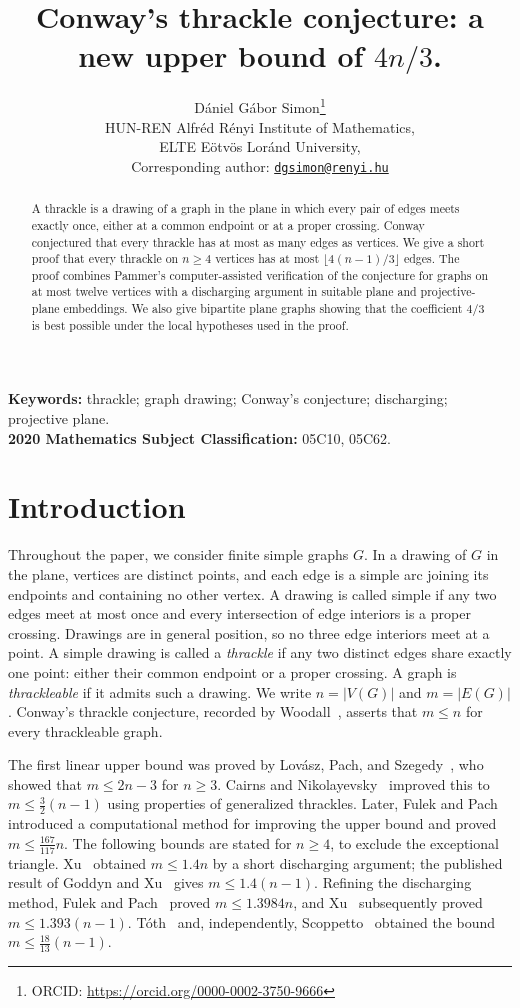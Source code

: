 \documentclass[11pt,a4paper]{article}
\title{Conway's thrackle conjecture: a new upper bound of $4n/3$.}
\author{D\'aniel G\'abor Simon\thanks{ORCID: \url{https://orcid.org/0000-0002-3750-9666}}\\[4pt]
\small HUN-REN Alfr\'ed R\'enyi Institute of Mathematics,\\
\small ELTE E\"otv\"os Lor\'and University,\\[2pt]
\small Corresponding author: \href{mailto:dgsimon@renyi.hu}{\texttt{dgsimon@renyi.hu}}}
\date{}
\begin{document}
\maketitle

\begin{abstract}
A thrackle is a drawing of a graph in the plane in which every pair of
edges meets exactly once, either at a common endpoint or at a proper
crossing. Conway conjectured that every thrackle has at most as many
edges as vertices. We give a short proof that every thrackle on
$n\ge4$ vertices has at most $\lfloor4(n-1)/3\rfloor$ edges.
The proof combines Pammer's computer-assisted verification of the conjecture for graphs on at most twelve vertices with a discharging argument in suitable plane and projective-plane embeddings. We also give bipartite plane graphs showing
that the coefficient $4/3$ is best possible under the local hypotheses
used in the proof.
\end{abstract}

\noindent\textbf{Keywords:} thrackle; graph drawing; Conway's conjecture;
discharging; projective plane.\\
\textbf{2020 Mathematics Subject Classification:} 05C10, 05C62.

\section{Introduction}

Throughout the paper, we consider finite simple graphs $G$. In a drawing
of $G$ in the plane, vertices are distinct points, and each edge is a
simple arc joining its endpoints and containing no other vertex. A drawing
is called simple if any two edges meet at most once and every intersection
of edge interiors is a proper crossing. Drawings are in general position,
so no three edge interiors meet at a point.
A simple drawing is called a \emph{thrackle} if any two distinct edges
share exactly one point: either their common endpoint or a proper
crossing. A graph is \emph{thrackleable} if it admits such a drawing.
We write $n=|V(G)|$ and $m=|E(G)|$. Conway's thrackle conjecture,
recorded by Woodall~\cite{Woodall1971}, asserts that $m\le n$ for
every thrackleable graph.

The first linear upper bound
was proved by Lov\'asz, Pach, and Szegedy~\cite{LPS1997}, who showed that
$m\le2n-3$ for $n\ge3$. Cairns and Nikolayevsky~\cite{CN2000} improved
this to $m\le\frac32(n-1)$ using properties of generalized thrackles.
Later, Fulek and Pach~\cite{FP2011} introduced a computational method
for improving the upper bound and proved $m\le\frac{167}{117}n$.
The following bounds are stated for $n\ge4$, to exclude the exceptional
triangle. Xu~\cite{Xu2014} obtained $m\le1.4n$ by a short discharging
argument; the published result of Goddyn and Xu~\cite{GX2017} gives
$m\le1.4(n-1)$. Refining the discharging method, Fulek and
Pach~\cite{FP2019} proved $m\le1.3984n$, and Xu~\cite{Xu2021}
subsequently proved $m\le1.393(n-1)$.
T\'oth~\cite{Toth2026} and, independently, Scoppetto~\cite{Scoppetto2026}
obtained the bound $m\le\frac{18}{13}(n-1)$.
\end{document}
